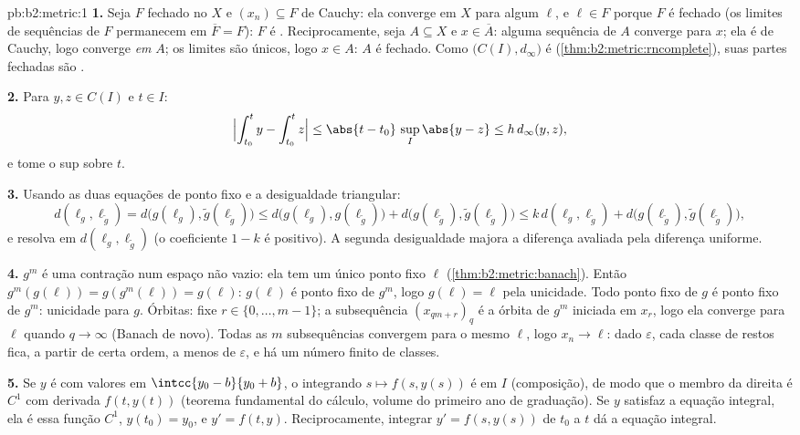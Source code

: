 \begin{solution}{pb:b2:metric:1}
\textbf{1.} Seja $F$ fechado no  $X$ e $(x_n)
\subseteq F$ de Cauchy: ela converge em $X$ para algum $\ell$, e
$\ell \in F$ porque $F$ é fechado (os limites de sequências de $F$
permanecem em $\overline F = F$): $F$ é . Reciprocamente, seja $A
\subseteq X$  e $x \in \overline A$: alguma sequência
de $A$ converge para $x$; ela é de Cauchy, logo converge \emph{em}
$A$; os limites são únicos, logo $x \in A$: $A$ é fechado. Como
$\bigl(C(I), d_\infty\bigr)$ é 
(\cref{thm:b2:metric:rncomplete}), suas partes fechadas são
.

\textbf{2.} Para $y, z \in C(I)$ e $t \in I$:
\[
\Bigl|\int_{t_0}^{t}y - \int_{t_0}^{t}z\Bigr| \leq
\abs{t - t_0}\,\sup_I\abs{y - z} \leq h\,d_\infty(y, z),
\]
e tome o sup sobre $t$.

\textbf{3.} Usando as duas equações de ponto fixo e a desigualdade
triangular:
\[
d(\ell_g, \ell_{\widetilde g})
= d\bigl(g(\ell_g), \widetilde g(\ell_{\widetilde g})\bigr)
\leq d\bigl(g(\ell_g), g(\ell_{\widetilde g})\bigr) +
d\bigl(g(\ell_{\widetilde g}), \widetilde g(\ell_{\widetilde
g})\bigr)
\leq k\,d(\ell_g, \ell_{\widetilde g}) +
d\bigl(g(\ell_{\widetilde g}), \widetilde g(\ell_{\widetilde
g})\bigr),
\]
e resolva em $d(\ell_g, \ell_{\widetilde g})$ (o coeficiente
$1 - k$ é positivo). A segunda desigualdade majora a
diferença avaliada pela diferença uniforme.

\textbf{4.} $g^m$ é uma contração num espaço  não vazio:
ela tem um único ponto fixo $\ell$
(\cref{thm:b2:metric:banach}). Então $g^m(g(\ell)) =
g(g^m(\ell)) = g(\ell)$: $g(\ell)$ é ponto fixo de $g^m$,
logo $g(\ell) = \ell$ pela unicidade. Todo ponto fixo de $g$ é ponto fixo
de $g^m$: unicidade para $g$. Órbitas: fixe $r \in \{0, \dots,
m-1\}$; a subsequência $(x_{qm + r})_q$ é a órbita de $g^m$
iniciada em $x_r$, logo ela converge para $\ell$ quando $q \to \infty$
(Banach de novo). Todas as $m$ subsequências convergem para o mesmo
$\ell$, logo $x_n \to \ell$: dado $\varepsilon$, cada classe de
restos fica, a partir de certa ordem, a menos de $\varepsilon$, e há um número finito
de classes.

\textbf{5.} Se $y$ é  com valores em $\intcc{y_0 -
b}{y_0 + b}$, o integrando $s \mapsto f(s, y(s))$ é 
em $I$ (composição), de modo que o membro da direita é $C^1$ com
derivada $f(t, y(t))$ (teorema fundamental do cálculo, volume do primeiro
ano de graduação). Se $y$ satisfaz a equação integral, ela é essa
função $C^1$, $y(t_0) = y_0$, e $y' = f(t, y)$. Reciprocamente,
integrar $y' = f(s, y(s))$ de $t_0$ a $t$ dá a
equação integral.


\end{solution}
